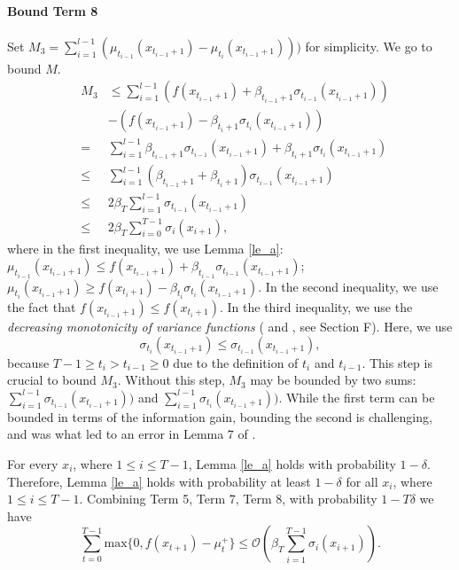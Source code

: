 \documentclass[twoside]{article}
\begin{document}
\paragraph{Bound Term 8}
Set $M_3 = \sum_{i=1}^{l-1} (\mu_{t_{i-1}}(x_{t_{i-1} +1}) - \mu_{t_i}(x_{t_{i-1} +1})))$ for simplicity. We go to bound $M$.
\begin{eqnarray*}
& M_3 &  \le   \sum_{i=1}^{l-1} (f(x_{t_{i-1} +1}) + \beta_{t_{i-1}+1}\sigma_{t_{i-1}}(x_{t_{i-1} +1}))  \\
&  & - (f(x_{t_{i-1} +1})- \beta_{t_{i}+1}\sigma_{t_{i}}(x_{t_{i-1} +1})) \\
& = & \sum_{i=1}^{l-1} \beta_{t_{i-1}+1}\sigma_{t_{i-1}}(x_{t_{i-1} +1}) + \beta_{t_{i}+1}\sigma_{t_{i}}(x_{t_{i-1} +1}) \\
& \le & \sum_{i=1}^{l-1}(\beta_{t_{i-1}+1} + \beta_{t_{i}+1})\sigma_{t_{i-1}}(x_{t_{i-1} +1})\\
& \le & 2\beta_T \sum_{i=1}^{l-1}\sigma_{t_{i-1}}(x_{t_{i-1} +1})\\
& \le & 2\beta_T \sum_{i=0}^{T-1} \sigma_{i}(x_{i+1}),
\end{eqnarray*}
where in the first inequality, we use Lemma \ref{le_a}: $\mu_{t_{i-1}}(x_{t_{i-1} +1}) \le f(x_{t_{i-1} +1}) + \beta_{t_{i-1}}\sigma_{t_{i-1}}(x_{t_{i-1} +1})$; $\mu_{t_i}(x_{t_{i-1} +1}) \ge f(x_{t_{i} +1}) - \beta_{t_{i}}\sigma_{t_{i}}(x_{t_{i-1} +1})$. In the second inequality, we use the fact that $f(x_{t_{i-1} +1}) \le f(x_{t_{i} +1})$. In the third inequality, we use the \emph{decreasing monotonicity of variance functions} (\citep{vivarelli} and \citep{Chowdhury17}, see Section F). Here, we use $$\sigma_{t_{i}}(x_{t_{i-1} +1}) \le \sigma_{t_{i-1}}(x_{t_{i-1} +1}),$$ because $T-1 \ge t_i > t_{i-1} \ge 0$ due to the definition of $t_i$ and $t_{i-1}$.
This step is crucial to bound $M_3$. Without this step, $M_3$ may be bounded by two sums:  $\sum^{l-1}_{i=1}  \sigma_{t_{i-1}}(x_{t_{i-1} +1}))$ and $ \sum^{l-1}_{i=1} \sigma_{t_{i}}(x_{t_{i-1} +1}))$. While the first term can be bounded in terms of the information gain, bounding the second is challenging, and was what led to an error in Lemma 7 of \cite{nguyen17a}.

For every $x_i$, where $ 1 \le i \le T-1$, Lemma \ref{le_a} holds with probability $1 -\delta$. Therefore, Lemma \ref{le_a} holds with probability at least $1 -\delta$ for all $x_i$, where $ 1 \le i \le T-1$.
Combining Term 5, Term 7, Term 8, with probability $1 -T\delta$ we have
$$\sum_{t=0}^{T-1} \text{max}\{0, f(x_{t+1}) - \mu_t^+\} \le  \mathcal O(\beta_T \sum_{i=1}^{T-1} \sigma_{i}(x_{i+1})).$$
\end{document}
